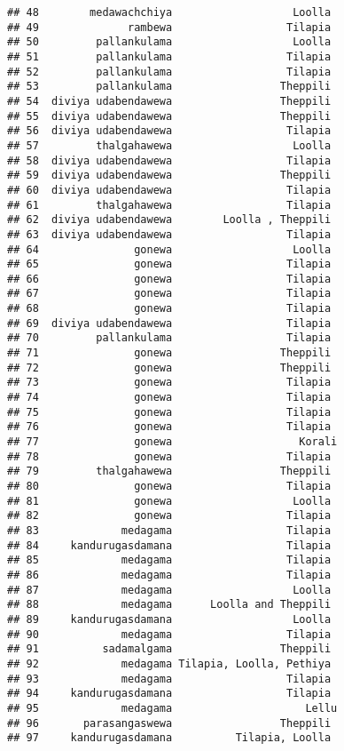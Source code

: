 \documentclass[
]{article}
\begin{document}
\begin{verbatim}
## 48        medawachchiya                   Loolla 
## 49              rambewa                  Tilapia 
## 50         pallankulama                   Loolla 
## 51         pallankulama                  Tilapia 
## 52         pallankulama                  Tilapia 
## 53         pallankulama                 Theppili 
## 54  diviya udabendawewa                 Theppili 
## 55  diviya udabendawewa                 Theppili 
## 56  diviya udabendawewa                  Tilapia 
## 57         thalgahawewa                   Loolla 
## 58  diviya udabendawewa                  Tilapia 
## 59  diviya udabendawewa                 Theppili 
## 60  diviya udabendawewa                  Tilapia 
## 61         thalgahawewa                  Tilapia 
## 62  diviya udabendawewa        Loolla , Theppili 
## 63  diviya udabendawewa                  Tilapia 
## 64               gonewa                   Loolla 
## 65               gonewa                  Tilapia 
## 66               gonewa                  Tilapia 
## 67               gonewa                  Tilapia 
## 68               gonewa                  Tilapia 
## 69  diviya udabendawewa                  Tilapia 
## 70         pallankulama                  Tilapia 
## 71               gonewa                 Theppili 
## 72               gonewa                 Theppili 
## 73               gonewa                  Tilapia 
## 74               gonewa                  Tilapia 
## 75               gonewa                  Tilapia 
## 76               gonewa                  Tilapia 
## 77               gonewa                    Korali
## 78               gonewa                  Tilapia 
## 79         thalgahawewa                 Theppili 
## 80               gonewa                  Tilapia 
## 81               gonewa                   Loolla 
## 82               gonewa                  Tilapia 
## 83             medagama                  Tilapia 
## 84     kandurugasdamana                  Tilapia 
## 85             medagama                  Tilapia 
## 86             medagama                  Tilapia 
## 87             medagama                   Loolla 
## 88             medagama      Loolla and Theppili 
## 89     kandurugasdamana                   Loolla 
## 90             medagama                  Tilapia 
## 91          sadamalgama                 Theppili 
## 92             medagama Tilapia, Loolla, Pethiya 
## 93             medagama                  Tilapia 
## 94     kandurugasdamana                  Tilapia 
## 95             medagama                     Lellu
## 96       parasangaswewa                 Theppili 
## 97     kandurugasdamana          Tilapia, Loolla 

\end{verbatim}
\end{document}
